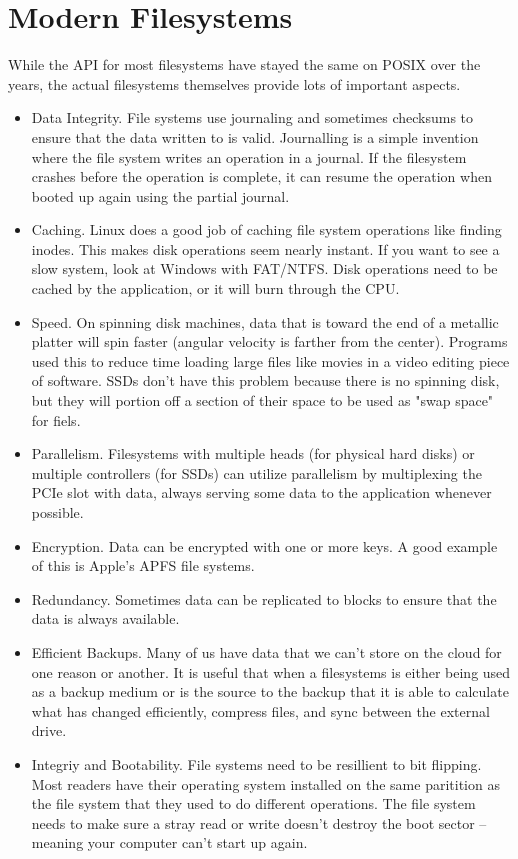 \section{Modern Filesystems}

While the API for most filesystems have stayed the same on POSIX over the years, the actual filesystems themselves provide lots of important aspects.

\begin{itemize}
\item Data Integrity. File systems use journaling and sometimes checksums to ensure that the data written to is valid. Journalling is a simple invention where the file system writes an operation in a journal. If the filesystem crashes before the operation is complete, it can resume the operation when booted up again using the partial journal.
\item Caching. Linux does a good job of caching file system operations like finding inodes. This makes disk operations seem nearly instant. If you want to see a slow system, look at Windows with FAT/NTFS. Disk operations need to be cached by the application, or it will burn through the CPU.
\item Speed. On spinning disk machines, data that is toward the end of a metallic platter will spin faster (angular velocity is farther from the center). Programs used this to reduce time loading large files like movies in a video editing piece of software. SSDs don't have this problem because there is no spinning disk, but they will portion off a section of their space to be used as "swap space" for fiels.
\item Parallelism. Filesystems with multiple heads (for physical hard disks) or multiple controllers (for SSDs) can utilize parallelism by multiplexing the PCIe slot with data, always serving some data to the application whenever possible.
\item Encryption. Data can be encrypted with one or more keys. A good example of this is Apple's APFS file systems.
\item Redundancy. Sometimes data can be replicated to blocks to ensure that the data is always available.
\item Efficient Backups. Many of us have data that we can't store on the cloud for one reason or another. It is useful that when a filesystems is either being used as a backup medium or is the source to the backup that it is able to calculate what has changed efficiently, compress files, and sync between the external drive.
\item Integriy and Bootability. File systems need to be resillient to bit flipping. Most readers have their operating system installed on the same paritition as the file system that they used to do different operations. The file system needs to make sure a stray read or write doesn't destroy the boot sector -- meaning your computer can't start up again.

\end{itemize}
